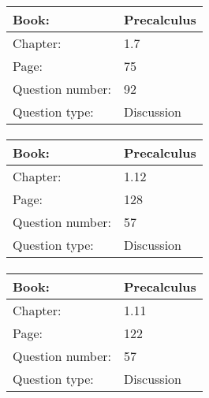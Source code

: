 \documentclass{article}
\begin{document}
            \paragraph{}
            \begin{tabularx}{1\textwidth}{
                    p{}
                    p{}
                }
                \toprule
                Book: & Precalculus
                \\
                \midrule
                Chapter: & 1.7
                \\
                \midrule
                Page: & 75
                \\
                \midrule
                Question number: & 92
                \\
                \midrule
                Question type: & Discussion
                \\
                \bottomrule
            \end{tabularx}
            
            \paragraph{}
            \begin{tabularx}{1\textwidth}{
                    p{}
                    p{}
                }
                \toprule
                Book: & Precalculus
                \\
                \midrule
                Chapter: & 1.12
                \\
                \midrule
                Page: & 128
                \\
                \midrule
                Question number: & 57
                \\
                \midrule
                Question type: & Discussion
                \\
                \bottomrule
            \end{tabularx}
            
            \paragraph{}
            \begin{tabularx}{1\textwidth}{
                    p{}
                    p{}
                }
                \toprule
                Book: & Precalculus
                \\
                \midrule
                Chapter: & 1.11
                \\
                \midrule
                Page: & 122
                \\
                \midrule
                Question number: & 57
                \\
                \midrule
                Question type: & Discussion
                \\
                \bottomrule
            \end{tabularx}
            
\end{document}
